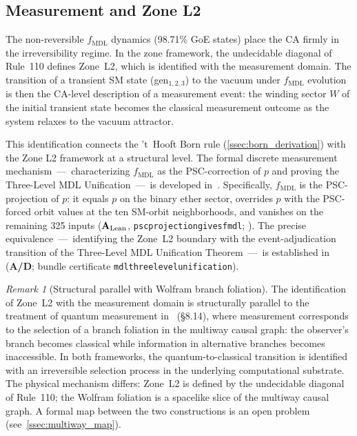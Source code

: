 \documentclass[11pt]{article}
\theoremstyle{remark}
\newtheorem{remark}[theorem]{Remark}
\newcommand{\GTE}{\text{GTE}}
\newcommand{\MDL}{\text{MDL}}
\newcommand{\lean}[1]{%
  \penalty-100
  \begingroup\def\_{\textunderscore\allowbreak}\texttt{#1}\endgroup}
\newcommand{\CatAL}{\ensuremath{\textbf{A}_{\rm Lean}}}
\newcommand{\CatAD}{\textbf{A/D}}
\begin{document}
\subsection{Measurement and Zone L2}
\label{ssec:zone}

The non-reversible $f_{\MDL}$ dynamics (98.71\% GoE states) place the
\GTE{} CA firmly in the irreversibility regime.
In the zone framework, the undecidable diagonal of Rule~110 defines
Zone~L2, which is identified with the measurement domain.
The transition of a transient SM state (gen$_{1,2,3}$) to the vacuum
under $f_{\MDL}$ evolution is then the CA-level description of a
measurement event: the winding sector $W$ of the initial transient
state becomes the classical measurement outcome as the system relaxes
to the vacuum attractor.

This identification connects the 't~Hooft Born rule (\cref{ssec:born_derivation})
with the Zone L2 framework at a structural level.
The formal discrete measurement mechanism~---~characterizing $f_{\MDL}$ as the
PSC-correction of $p$ and proving the Three-Level MDL Unification~---~is
developed in~\cite{SpivackPolynomialTransputation}.
Specifically, $f_{\MDL}$ is the PSC-projection of $p$: it equals $p$ on the
binary ether sector, overrides $p$ with the PSC-forced orbit values at the
ten SM-orbit neighborhoods, and vanishes on the remaining 325 inputs
(\CatAL{}, \lean{psc\_projection\_gives\_fmdl};
\cite{SpivackPolynomialTransputation}).
The precise equivalence~---~identifying the Zone~L2 boundary with the
event-adjudication transition of the Three-Level MDL Unification
Theorem~---~is established in~\cite{SpivackPolynomialTransputation}
(\CatAD{}; bundle certificate \lean{mdl\_three\_level\_unification}).

\begin{remark}[Structural parallel with Wolfram branch foliation]\label{rem:wolfram_measurement}
The identification of Zone~L2 with the measurement domain is
structurally parallel to the treatment of quantum measurement
in~\cite{Wolfram2020Tech} (\S8.14), where measurement corresponds to
the selection of a branch foliation in the multiway causal graph: the
observer's branch becomes classical while information in alternative
branches becomes inaccessible.
In both frameworks, the quantum-to-classical transition is identified
with an irreversible selection process in the underlying computational
substrate.
The physical mechanism differs: Zone~L2 is defined by the undecidable
diagonal of Rule~110; the Wolfram foliation is a spacelike slice of the
multiway causal graph.
A formal map between the two constructions is an open problem
(see~\cref{ssec:multiway_map}).
\end{remark}
\end{document}
